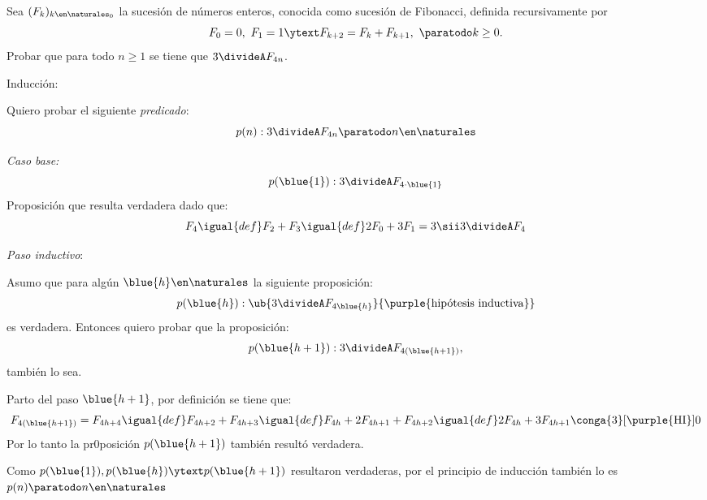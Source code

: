 \begin{enunciado}{\ejExtra}
  Sea $(F_k)_{k\en \naturales_0}$ la sucesión de números enteros, conocida como sucesión de Fibonacci,
  definida recursivamente por
  $$
    F_0 = 0,~ F_1= 1
    \ytext
    F_{k+2} = F_k + F_{k+1},~ \paratodo k \geq 0 .
  $$
  Probar que para todo $n \geq 1$ se tiene que $3 \divideA F_{4n}$.
\end{enunciado}

Inducción:

Quiero probar el siguiente \textit{predicado}:
$$
  p(n) : 3 \divideA F_{4n} \paratodo n \en \naturales
$$

\textit{Caso base:}
$$
  p(\blue{1}) : 3 \divideA F_{4 \cdot \blue{1}}
$$
Proposición que resulta verdadera dado que:
$$
  F_4 \igual{def}
  F_2 + F_3 \igual{def}
  2F_0 + 3F_1 = 3
  \sii
  3 \divideA F_4
$$

\textit{Paso inductivo}:

Asumo que para algún $\blue{h} \en \naturales$ la siguiente proposición:
$$
  p(\blue{h}) :
  \ub{
    3 \divideA F_{4\blue{h}}
  }{
    \text{\purple{hipótesis inductiva}}
  }
$$
es verdadera. Entonces quiero probar que la proposición:
$$
  p(\blue{h+1}) : 3 \divideA F_{4(\blue{h+1})},
$$
también lo sea.

\medskip

Parto del paso $\blue{h+1}$, por definición se tiene que:
$$
  F_{4(\blue{h+1})} =
  F_{4h+4} \igual{def}
  F_{4h+2} + F_{4h+3} \igual{def}
  F_{4h} + 2F_{4h+1} + F_{4h+2} \igual{def}
  2F_{4h} + 3F_{4h+1} \conga{3}[\text{\purple{HI}}] 0
$$
Por lo tanto la pr0posición $p(\blue{h+1})$ también resultó verdadera.

Como
$p(\blue{1}), p(\blue{h}) \ytext p(\blue{h + 1})$ resultaron verdaderas, por el principio de inducción también
lo es $p(n) \paratodo n \en \naturales$

\begin{aportes}
  \item {}
\end{aportes}

